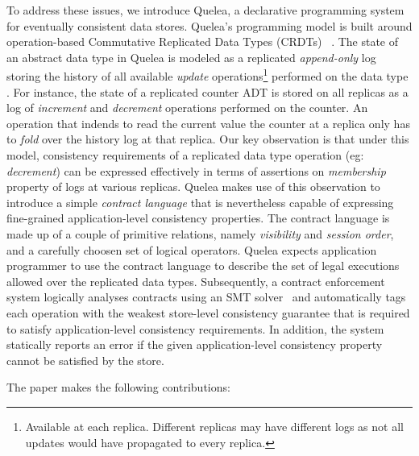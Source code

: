 To address these issues, we introduce Quelea, a declarative programming system
for eventually consistent data stores. Quelea's programming model is built
around operation-based Commutative Replicated Data Types (CRDTs)
~\cite{shapiroCRDT}. The state of an abstract data type in Quelea is modeled as
a replicated \emph{append-only} log storing the history of all available
\emph{update} operations\footnote{Available at each replica. Different replicas
may have different logs as not all updates would have propagated to every
replica.} performed on the data type . For instance, the state of a replicated
counter ADT is stored on all replicas as a log of \emph{increment} and
\emph{decrement} operations performed on the counter. An operation that indends
to read the current value the counter at a replica only has to \emph{fold} over
the history log at that replica. Our key observation is that under this model,
consistency requirements of a replicated data type operation (eg:
\emph{decrement}) can be expressed effectively in terms of assertions on
\emph{membership} property of logs at various replicas. Quelea makes use of this
observation to introduce a simple \emph{contract language} that is nevertheless
capable of expressing fine-grained application-level consistency properties.
The contract language is made up of a couple of primitive relations, namely
\emph{visibility} and \emph{session order}, and a carefully choosen set of
logical operators. Quelea expects application programmer to use the contract
language to describe the set of legal executions allowed over the replicated
data types.  
Subsequently, a contract enforcement system logically analyses contracts using
an SMT solver~\cite{z3} and automatically tags each operation with the weakest
store-level consistency guarantee that is required to satisfy application-level
consistency requirements. In addition, the system statically reports an error if
the given application-level consistency property cannot be satisfied by the
store. 

The paper makes the following contributions:

